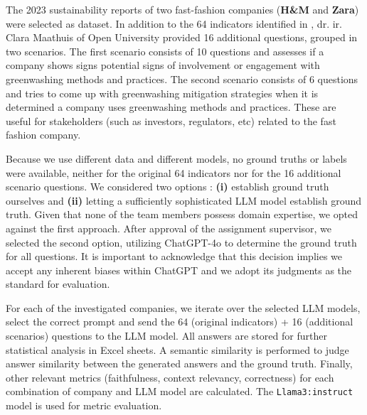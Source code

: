 \documentclass[]{article}
\begin{document}
The 2023 sustainability reports of two fast-fashion companies (\textbf{H\&M} and \textbf{Zara}) were selected as dataset.
In addition to the 64 indicators identified in \cite{durability}, dr. ir. Clara Maathuis of Open University \cite{ou} provided 16 additional questions, grouped in two scenarios.
The first scenario consists of 10 questions and assesses if a company shows signs potential signs of involvement or engagement with greenwashing methods and practices.
The second scenario consists of 6 questions and tries to come up with greenwashing mitigation strategies when it is determined a company uses greenwashing methods and practices.
These are useful for stakeholders (such as investors, regulators, etc) related to the fast fashion company.

Because we use different data and different models, no ground truths or labels were available, neither for the original 64 indicators nor for the 16 additional scenario questions.
We considered two options : \textbf{(i)} establish ground truth ourselves and \textbf{(ii)} letting a sufficiently sophisticated LLM model establish ground truth.
Given that none of the team members possess domain expertise, we opted against the first approach.
After approval of the assignment supervisor, we selected the second option, utilizing ChatGPT-4o to determine the ground truth for all questions.
It is important to acknowledge that this decision implies we accept any inherent biases within ChatGPT and we adopt its judgments as the standard for evaluation.

For each of the investigated companies, we iterate over the selected LLM models, select the correct prompt and send the 64 (original indicators) + 16 (additional scenarios) questions to the LLM model.
All answers are stored for further statistical analysis in Excel sheets.
A semantic similarity is performed to judge answer similarity between the generated answers and the ground truth.
Finally, other relevant metrics (faithfulness, context relevancy, correctness) for each combination of company and LLM model are calculated.
The \texttt{Llama3:instruct} model is used for metric evaluation.
\end{document}
